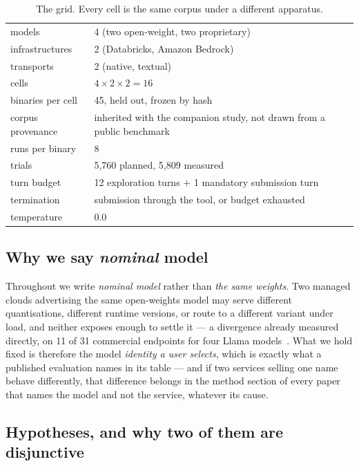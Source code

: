 \begin{table}[h]
\caption{The grid. Every cell is the same corpus under a different apparatus.}
\label{tab:grid}
\centering
\small
\begin{tabular}{ll}
\toprule
models & 4 (two open-weight, two proprietary) \\
infrastructures & 2 (Databricks, Amazon Bedrock) \\
transports & 2 (native, textual) \\
cells & $4\times2\times2 = 16$ \\
binaries per cell & 45, held out, frozen by hash \\
corpus provenance & inherited with the companion study, not drawn from a public benchmark \\
runs per binary & 8 \\
trials & 5{,}760 planned, 5{,}809 measured \\
turn budget & 12 exploration turns $+$ 1 mandatory submission turn \\
termination & submission through the tool, or budget exhausted \\
temperature & 0.0 \\
\bottomrule
\end{tabular}
\end{table}

\subsection{Why we say \emph{nominal} model}
\label{sec:nominal}

Throughout we write \emph{nominal model} rather than \emph{the same weights}. Two managed clouds
advertising the same open-weights model may serve different quantisations, different runtime versions, or
route to a different variant under load, and neither exposes enough to settle it --- a divergence already
measured directly, on 11 of 31 commercial endpoints for four Llama models~\citep{gao2025equality}. What we hold fixed is
therefore the model \emph{identity a user selects}, which is exactly what a published evaluation names in
its table --- and if two services selling one name behave differently, that difference belongs in the
method section of every paper that names the model and not the service, whatever its cause.

\subsection{Hypotheses, and why two of them are disjunctive}
\label{sec:ipotesi}

